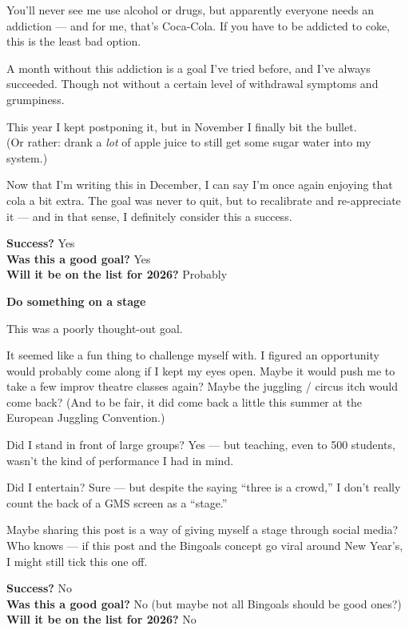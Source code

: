 \documentclass[12pt]{article}
\begin{document}
You'll never see me use alcohol or drugs, but apparently everyone needs
an addiction --- and for me, that's Coca-Cola. If you have to be
addicted to coke, this is the least bad option.

A month without this addiction is a goal I've tried before, and I've
always succeeded. Though not without a certain level of withdrawal
symptoms and grumpiness.

This year I kept postponing it, but in November I finally bit the
bullet.\\
(Or rather: drank a \emph{lot} of apple juice to still get some sugar
water into my system.)

Now that I'm writing this in December, I can say I'm once again enjoying
that cola a bit extra. The goal was never to quit, but to recalibrate
and re-appreciate it --- and in that sense, I definitely consider this a
success.

\textbf{Success?} Yes\\
\textbf{Was this a good goal?} Yes\\
\textbf{Will it be on the list for 2026?} Probably

\textbf{Do something on a stage}

This was a poorly thought-out goal.

It seemed like a fun thing to challenge myself with. I figured an
opportunity would probably come along if I kept my eyes open. Maybe it
would push me to take a few improv theatre classes again? Maybe the
juggling / circus itch would come back? (And to be fair, it did come
back a little this summer at the European Juggling Convention.)

Did I stand in front of large groups? Yes --- but teaching, even to 500
students, wasn't the kind of performance I had in mind.

Did I entertain? Sure --- but despite the saying ``three is a crowd,'' I
don't really count the back of a GMS screen as a ``stage.''

Maybe sharing this post is a way of giving myself a stage through social
media?\\
Who knows --- if this post and the Bingoals concept go viral around New
Year's, I might still tick this one off.

\textbf{Success?} No\\
\textbf{Was this a good goal?} No (but maybe not all Bingoals should be
good ones?)\\
\textbf{Will it be on the list for 2026?} No
\end{document}
